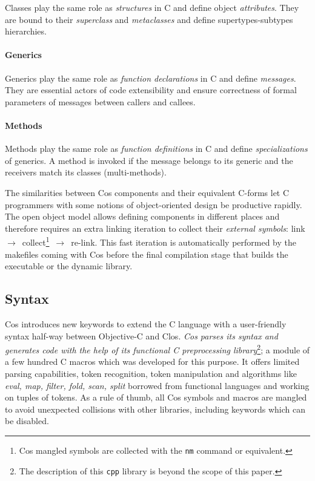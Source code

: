 \documentclass[preprint,10pt]{sigplanconf}
\newcommand{\ProgLang}[1]{{\sc #1}\xspace}
\newcommand{\Clos}      {\ProgLang{Clos}}
\newcommand{\Cos}       {\ProgLang{Cos}}
\newcommand{\Objc}      {\ProgLang{Objective-C}}
\newcommand{\code}[1]{\lstinline[language=COS,style=samplecode]|#1|}
\begin{document}
Classes play the same role as {\em structures} in C and define object {\em attributes}. They are bound to their {\em superclass} and {\em metaclasses} and define supertypes-subtypes hierarchies.

\paragraph{Generics}

Generics play the same role as {\em function declarations} in C and define {\em messages}. They are essential actors of code extensibility and ensure correctness of formal parameters of messages between callers and callees.

\paragraph{Methods}

Methods play the same role as {\em function definitions} in C and define {\em specializations} of generics. A method is invoked if the message belongs to its generic and the receivers match its classes (multi-methods).

\mbox{}\newline
The similarities between \Cos components and their equivalent C-forms let C programmers with some notions of object-oriented design be productive rapidly. The open object model allows defining components in different places and therefore requires an extra linking iteration to collect their {\em external symbols}: link~$\rightarrow$~collect\footnote{\Cos mangled symbols are collected with the {\tt nm} command or equivalent.}~$\rightarrow$~re-link. This fast iteration is automatically performed by the makefiles coming with \Cos before the final compilation stage that builds the executable or the dynamic library.

\subsection{Syntax}

\Cos introduces new keywords to extend the C language with a user-friendly syntax half-way between \Objc and \Clos. {\em\Cos parses its syntax and generates code with the help of its functional C preprocessing library}\footnote{The description of this \code{cpp} library is beyond the scope of this paper.}; a module of a few hundred C macros which was developed for this purpose. It offers limited parsing capabilities, token recognition, token manipulation and algorithms like {\em eval, map, filter, fold, scan, split} borrowed from functional languages and working on tuples of tokens.
As a rule of thumb, all \Cos symbols and macros are mangled to avoid unexpected collisions with other libraries, including keywords which can be disabled. 
\end{document}
